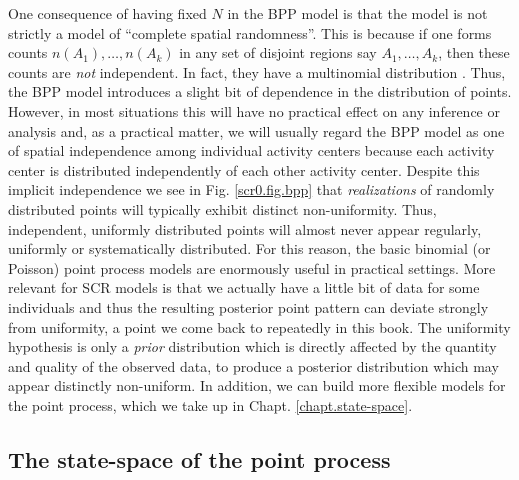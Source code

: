 One consequence of having fixed $N$ in the BPP model is that the
model is not strictly a model of ``complete spatial randomness''. This
is because if one forms counts $n(A_{1}),\ldots, n(A_{k})$ in any set
of disjoint regions say $A_{1}, \ldots, A_{k}$, then these counts are
{\it not} independent.  In fact, they have a multinomial distribution
\citep[see][p. 61]{illian_etal:2008}. Thus, the BPP model introduces
a slight bit of dependence in the distribution of points. However, in
most situations this will have no practical effect on any inference or
analysis and, as a practical matter, we will usually regard the BPP
model as one of spatial independence among individual activity centers
because each activity center is distributed independently of each
other activity center. Despite this implicit independence we see in
Fig. \ref{scr0.fig.bpp} that {\it realizations} of randomly distributed
points will typically exhibit distinct non-uniformity. Thus,
independent, uniformly distributed points will almost never appear
regularly, uniformly or systematically distributed. For this reason,
the basic binomial (or Poisson) point process models are enormously
useful in practical settings.  More relevant for SCR models is that we
actually have a little bit of data for some individuals and thus the
resulting posterior point pattern can deviate strongly from
uniformity, a point we come back to repeatedly in this book.
The uniformity hypothesis is only
a {\it prior} distribution which is directly affected by the quantity
and quality of the observed data, to produce a posterior distribution which
may appear distinctly non-uniform.  In addition, we can build more
flexible models for the point process, which we take up in Chapt. \ref{chapt.state-space}.


\subsection{The state-space of the point process}

